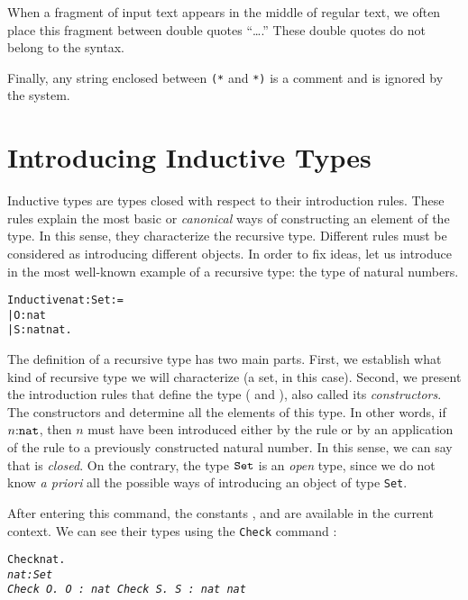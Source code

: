 \documentclass[11pt]{article}
\newcommand{\refmancite}[1]{{}}
\begin{document}
When a fragment of \coq{} input text appears in the middle of
regular text, we often place this fragment between double quotes
``\dots.''  These double quotes do not belong to the \coq{} syntax.

Finally, any
string enclosed between \texttt{(*} and \texttt{*)} is a comment and
is ignored by the \coq{} system.

\section{Introducing Inductive Types}
\label{Introduction}

Inductive types are types closed with respect to their introduction
rules. These rules explain the most basic or \textsl{canonical} ways
of constructing an element of the type.  In this sense, they
characterize the recursive type. Different rules must be considered as
introducing different objects. In order to fix ideas, let us introduce
in {\coq} the most well-known example of a recursive type: the type of
natural numbers.

\begin{alltt}
Inductive nat : Set :=
 | O : nat
 | S : nat\arrow{}nat.
\end{alltt}

The definition of a recursive type has two main parts. First, we
establish what kind of recursive type we will characterize (a set, in
this case). Second, we present the introduction rules that define the
type ({\Z} and {\SUCC}), also called its {\sl constructors}. The constructors
{\Z} and {\SUCC} determine all the elements of this type. In other
words, if $n\mbox{:}\texttt{nat}$, then $n$ must have been introduced either
by the rule {\Z} or by an application of the rule {\SUCC} to a
previously constructed natural number. In this sense, we can say
that {\nat} is \emph{closed}. On the contrary, the type
$\texttt{Set}$ is an {\it open} type, since we do not know {\it a priori} all
the possible ways of introducing an object of type \texttt{Set}.

After entering this command, the constants {\nat}, {\Z} and {\SUCC} are
available in the current context. We can see their types using the
\texttt{Check} command \refmancite{Section \ref{Check}}:

\begin{alltt}
Check nat.
\it{}nat : Set
\tt{}Check O.
\it{}O : nat
\tt{}Check S.
\it{}S : nat {\arrow} nat
\end{alltt}
\end{document}
